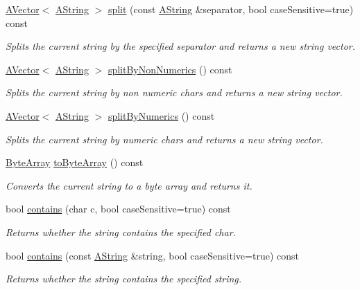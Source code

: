 \begin{DoxyCompactItemize}
\mbox{\hyperlink{class_a_vector}{A\+Vector}}$<$ \mbox{\hyperlink{class_a_string}{A\+String}} $>$ \mbox{\hyperlink{class_a_string_aee23c2323dc95f9e9c19512c9c985974}{split}} (const \mbox{\hyperlink{class_a_string}{A\+String}} \&separator, bool case\+Sensitive=true) const
\begin{DoxyCompactList}\small\item\em Splits the current string by the specified separator and returns a new string vector. \end{DoxyCompactList}\item 
\mbox{\hyperlink{class_a_vector}{A\+Vector}}$<$ \mbox{\hyperlink{class_a_string}{A\+String}} $>$ \mbox{\hyperlink{class_a_string_ab7375bf0b88b5923385b4cdc8fb02af8}{split\+By\+Non\+Numerics}} () const
\begin{DoxyCompactList}\small\item\em Splits the current string by non numeric chars and returns a new string vector. \end{DoxyCompactList}\item 
\mbox{\hyperlink{class_a_vector}{A\+Vector}}$<$ \mbox{\hyperlink{class_a_string}{A\+String}} $>$ \mbox{\hyperlink{class_a_string_a06ca78b1328505ba7c29ea2d1618ef6c}{split\+By\+Numerics}} () const
\begin{DoxyCompactList}\small\item\em Splits the current string by numeric chars and returns a new string vector. \end{DoxyCompactList}\item 
\mbox{\hyperlink{class_byte_array}{Byte\+Array}} \mbox{\hyperlink{class_a_string_ae9d0a67c87c20152d5ab770ad1b955ac}{to\+Byte\+Array}} () const
\begin{DoxyCompactList}\small\item\em Converts the current string to a byte array and returns it. \end{DoxyCompactList}\item 
bool \mbox{\hyperlink{class_a_string_aec4ad61af8cd225bda08719550ec8e72}{contains}} (char c, bool case\+Sensitive=true) const
\begin{DoxyCompactList}\small\item\em Returns whether the string contains the specified char. \end{DoxyCompactList}\item 
bool \mbox{\hyperlink{class_a_string_abe6a9966ef157e0584c279377b6c9987}{contains}} (const \mbox{\hyperlink{class_a_string}{A\+String}} \&string, bool case\+Sensitive=true) const
\begin{DoxyCompactList}\small\item\em Returns whether the string contains the specified string. \end{DoxyCompactList}\item 

\end{DoxyCompactItemize}
